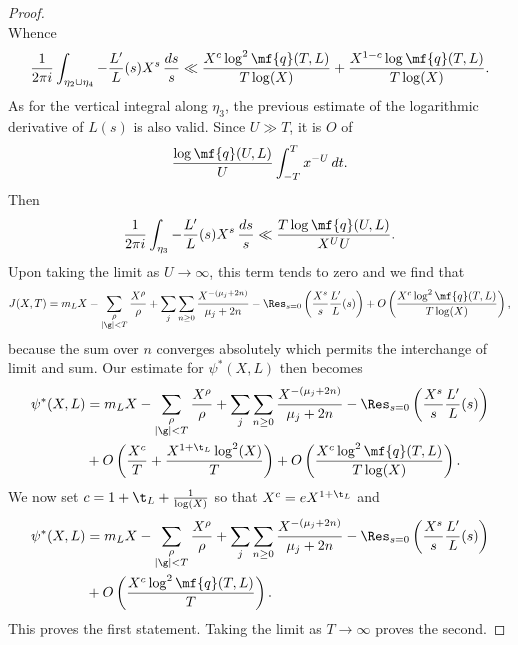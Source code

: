 \documentclass[12pt]{article}
\begin{document}
\begin{proof}
\[        \]
        Whence
        \[
          \frac{1}{2\pi i}\int_{\eta_{2} \cup \eta_{4}}-\frac{L'}{L}(s)X^{s}\,\frac{ds}{s} \ll \frac{X^{c}\log^{2}\mf{q}(T,L)}{T\log(X)}+\frac{X^{1-c}\log\mf{q}(T,L)}{T\log(X)}.
        \]
        As for the vertical integral along \(\eta_{3}\), the previous estimate of the logarithmic derivative of \(L(s)\) is also valid. Since \(U \gg T\), it is \(O\) of
        \[
          \frac{\log\mf{q}(U,L)}{U}\int_{-T}^{T}x^{-U}\,dt.
        \]
        Then
        \[
          \frac{1}{2\pi i}\int_{\eta_{3}}-\frac{L'}{L}(s)X^{s}\,\frac{ds}{s} \ll \frac{T\log\mf{q}(U,L)}{X^{U}U}.
        \]
        Upon taking the limit as \(U \to \infty\), this term tends to zero and we find that
        \[
          J(X,T) = m_{L}X-\sum_{\substack{\rho \\ |\g| < T}}\frac{X^{\rho}}{\rho}+\sum_{j}\sum_{n \ge 0}\frac{X^{-(\mu_{j}+2n)}}{\mu_{j}+2n}-\Res_{s = 0}\left(\frac{X^{s}}{s}\frac{L'}{L}(s)\right)+O\left(\frac{X^{c}\log^{2}\mf{q}(T,L)}{T\log(X)}\right),
        \]
        because the sum over \(n\) converges absolutely which permits the interchange of limit and sum. Our estimate for \(\psi^{\ast}(X,L)\) then becomes
        \begin{align*}
          \psi^{\ast}(X,L) &= m_{L}X-\sum_{\substack{\rho \\ |\g| < T}}\frac{X^{\rho}}{\rho}+\sum_{j}\sum_{n \ge 0}\frac{X^{-(\mu_{j}+2n)}}{\mu_{j}+2n}-\Res_{s = 0}\left(\frac{X^{s}}{s}\frac{L'}{L}(s)\right) \\
          &+ O\left(\frac{X^{c}}{T}+\frac{X^{1+\t_{L}}\log^{2}(X)}{T}\right)+O\left(\frac{X^{c}\log^{2}\mf{q}(T,L)}{T\log(X)}\right).
        \end{align*}
        We now set \(c = 1+\t_{L}+\frac{1}{\log(X)}\) so that \(X^{c} = eX^{1+\t_{L}}\) and
        \begin{align*}
          \psi^{\ast}(X,L) &= m_{L}X-\sum_{\substack{\rho \\ |\g| < T}}\frac{X^{\rho}}{\rho}+\sum_{j}\sum_{n \ge 0}\frac{X^{-(\mu_{j}+2n)}}{\mu_{j}+2n}-\Res_{s = 0}\left(\frac{X^{s}}{s}\frac{L'}{L}(s)\right) \\
          &+ O\left(\frac{X^{c}\log^{2}\mf{q}(T,L)}{T}\right).
        \end{align*}
        This proves the first statement. Taking the limit as \(T \to \infty\) proves the second.
      \end{proof}
  
\end{document}
